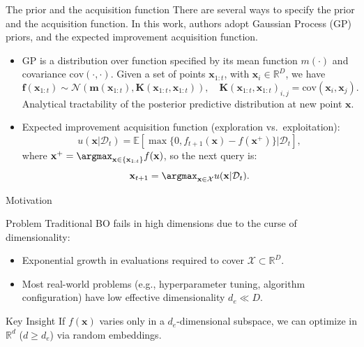 \documentclass[aspectratio=169]{beamer}
\begin{document}
\begin{frame}{The prior and the acquisition function}
    There are several ways to specify the prior and the acquisition function. In this work, authors adopt \alert{Gaussian Process} (GP) priors, and the \alert{expected improvement} acquisition function.
    \begin{itemize}
        \item GP is a distribution over function specified by its mean function $m(\cdot)$ and covariance $\mathrm{cov}(\cdot, \cdot)$. Given a set of points $\mathbf{x}_{1:t}$, with $\mathbf{x}_i \in \mathbb{R}^{D}$, we have
        \[
            \mathbf{f}(\mathbf{x}_{1:t}) \sim \mathcal{N}(\mathbf{m}(\mathbf{x}_{1:t}), \mathbf{K}(\mathbf{x}_{1:t}, \mathbf{x}_{1:t})), \quad \mathbf{K}(\mathbf{x}_{1:t}, \mathbf{x}_{1:t})_{i, j} = \mathrm{cov}(\mathbf{x}_i, \mathbf{x}_j).
        \]
        Analytical tractability of the posterior predictive distribution at new point $\mathbf{x}$.
        \item Expected improvement acquisition function (exploration vs.\ exploitation):
        \[
            u(\mathbf{x}|\mathcal{D}_t) = \mathbb{E}\left[\max\{0, f_{t+1}(\mathbf{x}) - f(\mathbf{x}^{+})\} | \mathcal{D}_t\right],
        \]
        where $\mathbf{x}^{+} = \argmax_{\mathbf{x} \in \{\mathbf{x}_{1:t}\}} f(\mathbf{x})$, so the next query is:
        \[
            \mathbf{x}_{t+1} = \argmax_{\mathbf{x} \in \mathcal{X}} u(\mathbf{x} | \mathcal{D}_t).
        \]
    \end{itemize}
\end{frame}

\begin{frame}{Motivation}
    \begin{block}{Problem}
        Traditional BO fails in high dimensions due to the curse of dimensionality:
        \begin{itemize}
            \item Exponential growth in evaluations required to cover $\mathcal{X} \subset \mathbb{R}^{D}$.
            \item Most real-world problems (e.g., hyperparameter tuning, algorithm configuration) have low \alert{effective dimensionality} $d_e \ll D$.
        \end{itemize}
    \end{block}
    \begin{block}{Key Insight}
        If $f(\mathbf{x})$ varies only in a $d_e$-dimensional subspace, we can optimize in $\mathbb{R}^{d}$ ($d \geq d_e$) via \alert{random embeddings}.
    \end{block}
\end{frame}
\end{document}
